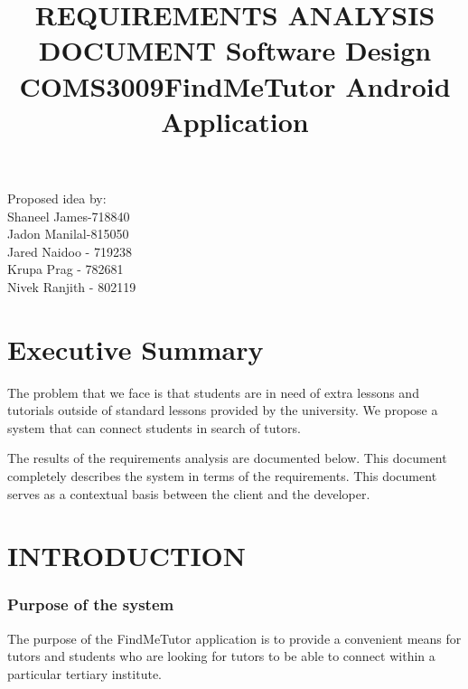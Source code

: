\documentclass[12pt]{article}
\begin{document}
\title{\textbf{REQUIREMENTS ANALYSIS DOCUMENT }}
\maketitle

\begin{center}
\title{\textbf{Software Design COMS3009}}
\maketitle
\end{center}
\begin{center}
\title{\textbf{FindMeTutor Android Application}}
\maketitle
\end{center}

\begin{center}
Proposed idea by:\\
Shaneel James-718840
\\Jadon Manilal-815050
\\Jared Naidoo - 719238
\\Krupa Prag - 782681
\\Nivek Ranjith - 802119
\end{center}


\newpage
\tableofcontents
\newpage


\section{\textbf{Executive Summary}}
\begin{flushleft}
The problem that we face is that students are in need of extra lessons and tutorials outside of standard lessons provided by the university. We propose a system that can connect students in search of tutors.

The results of the requirements analysis are documented below. This document completely describes the system in terms of the requirements. This document serves as a contextual basis between the client and the developer.
\end{flushleft}
\newpage
\section{INTRODUCTION}
\subsubsection{Purpose of the system}
\begin{flushleft}
The purpose of the FindMeTutor application is to provide a convenient means for tutors and students who are looking for tutors to be able to connect within a particular tertiary institute.
\end{flushleft}
\end{document}
